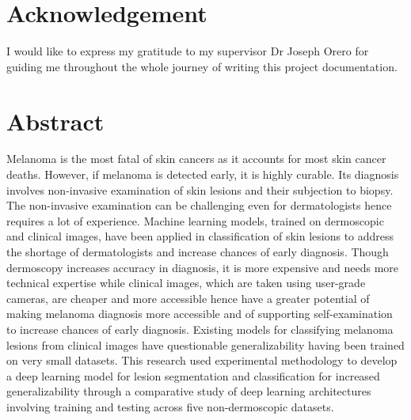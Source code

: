 \documentclass[12pt, a4paper]{article}
\begin{document}
\section*{Acknowledgement}
I would like to express my gratitude to my supervisor Dr Joseph Orero for guiding me throughout the whole journey of writing this project documentation.
\clearpage
\section*{Abstract}
Melanoma is the most fatal of skin cancers as it accounts for most skin cancer deaths. However, if melanoma is detected early, it is highly curable. Its diagnosis involves non-invasive examination of skin lesions and their subjection to biopsy. The non-invasive examination can be challenging even for dermatologists hence requires a lot of experience. Machine learning models, trained on dermoscopic and clinical images, have been applied in classification of skin lesions to address the shortage of dermatologists and increase chances of early diagnosis. Though dermoscopy increases accuracy in diagnosis, it is more expensive and needs more technical expertise while clinical images, which are taken using user-grade cameras, are cheaper and more accessible hence have a greater potential of making melanoma diagnosis more accessible and of supporting self-examination to increase chances of early diagnosis. Existing models for classifying melanoma lesions from clinical images have questionable generalizability having been trained on very small datasets. This research used experimental methodology to develop a deep learning model for lesion segmentation and classification for increased generalizability through a comparative study of deep learning architectures involving training and testing across five non-dermoscopic datasets.
\clearpage

\begin{center}
    \tableofcontents
    \clearpage
\end{center}
%
\begin{center}
    \listoffigures
    \clearpage
\end{center}
%
\begin{center}
    \listoftables
    \clearpage
\end{center}

\begin{center}
    \listofmyequations
    \clearpage
\end{center}
%
%
\end{document}
